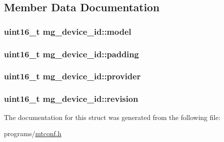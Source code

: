 \subsection{Member Data Documentation}
\hypertarget{structmg__device__id_a52bf2da2b7f45c77415071230b34e7c1}{
\subsubsection[{model}]{\setlength{\rightskip}{0pt plus 5cm}uint16\+\_\+t mg\+\_\+device\+\_\+id\+::model}}\label{structmg__device__id_a52bf2da2b7f45c77415071230b34e7c1}
\hypertarget{structmg__device__id_a7a2594163d9efb7db1eaec6f8bf746bd}{
\subsubsection[{padding}]{\setlength{\rightskip}{0pt plus 5cm}uint16\+\_\+t mg\+\_\+device\+\_\+id\+::padding}}\label{structmg__device__id_a7a2594163d9efb7db1eaec6f8bf746bd}
\hypertarget{structmg__device__id_a997dddde7b25e362be47970c28d79467}{
\subsubsection[{provider}]{\setlength{\rightskip}{0pt plus 5cm}uint16\+\_\+t mg\+\_\+device\+\_\+id\+::provider}}\label{structmg__device__id_a997dddde7b25e362be47970c28d79467}
\hypertarget{structmg__device__id_a722e6b6cac11edc35978ace2c0c5b33a}{
\subsubsection[{revision}]{\setlength{\rightskip}{0pt plus 5cm}uint16\+\_\+t mg\+\_\+device\+\_\+id\+::revision}}\label{structmg__device__id_a722e6b6cac11edc35978ace2c0c5b33a}


The documentation for this struct was generated from the following file\+:\begin{DoxyCompactItemize}
\item 
programs/\hyperlink{mtconf_8h}{mtconf.\+h}\end{DoxyCompactItemize}
